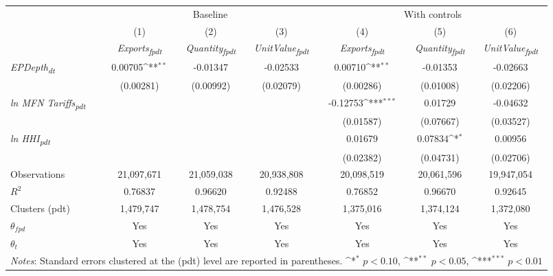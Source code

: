 {
\def\sym#1{\ifmmode^{#1}\else\(^{#1}\)\fi}
\begin{tabular}{l*{6}{c}}
\toprule
&\multicolumn{3}{c}{Baseline}&\multicolumn{3}{c}{With controls}\\\cmidrule(lr){2-4}\cmidrule(lr){5-7}
&(1)&(2)&(3)&(4)&(5)&(6)\\
&\textit{Exports\textsubscript{fpdt}}&\textit{Quantity\textsubscript{fpdt}}&\textit{UnitValue\textsubscript{fpdt}}&\textit{Exports\textsubscript{fpdt}}&\textit{Quantity\textsubscript{fpdt}}&\textit{UnitValue\textsubscript{fpdt}}\\
\midrule
\textit{EPDepth\textsubscript{dt}} & 0.00705\sym{**} & -0.01347 & -0.02533 & 0.00710\sym{**} & -0.01353 & -0.02663\\
 & (0.00281) & (0.00992) & (0.02079) & (0.00286) & (0.01008) & (0.02206)\\
\addlinespace
\textit{ln MFN Tariffs\textsubscript{pdt}} &  &  &  & -0.12753\sym{***} & 0.01729 & -0.04632\\
 &  &  &  & (0.01587) & (0.07667) & (0.03527)\\
\addlinespace
\textit{ln HHI\textsubscript{pdt}} &  &  &  & 0.01679 & 0.07834\sym{*} & 0.00956\\
 &  &  &  & (0.02382) & (0.04731) & (0.02706)\\
\midrule
Observations & 21,097,671 & 21,059,038 & 20,938,808 & 20,098,519 & 20,061,596 & 19,947,054\\
$R^{2}$ & 0.76837 & 0.96620 & 0.92488 & 0.76852 & 0.96670 & 0.92645\\
Clusters (pdt) & 1,479,747 & 1,478,754 & 1,476,528 & 1,375,016 & 1,374,124 & 1,372,080\\
$\theta_{fpd}$ & Yes & Yes & Yes & Yes & Yes & Yes\\
$\theta_{t}$ & Yes & Yes & Yes & Yes & Yes & Yes\\
\bottomrule
\multicolumn{7}{l}{\footnotesize \textit{Notes}: Standard errors clustered at the (pdt) level are reported in parentheses. \sym{*} \(p<0.10\), \sym{**} \(p<0.05\), \sym{***} \(p<0.01\)}\\
\end{tabular}
}
